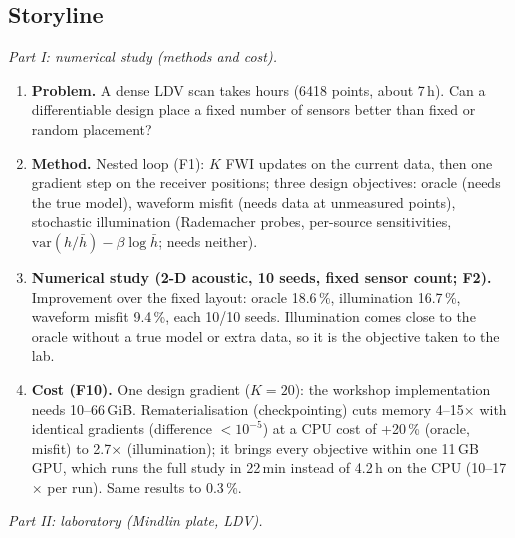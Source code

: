 \documentclass[10pt]{article}
\begin{document}
\subsection*{Storyline}
\emph{Part I: numerical study (methods and cost).}
\begin{enumerate}
\item \textbf{Problem.} A dense LDV scan takes hours (6418 points, about 7\,h). Can a differentiable design place a fixed number of sensors better than fixed or random placement?
\item \textbf{Method.} Nested loop (F1): $K$ FWI updates on the current data, then one gradient step on the receiver positions; three design objectives: oracle (needs the true model), waveform misfit (needs data at unmeasured points), stochastic illumination (Rademacher probes, per-source sensitivities, $\mathrm{var}(h/\bar h)-\beta\log\bar h$; needs neither).
\item \textbf{Numerical study (2-D acoustic, 10 seeds, fixed sensor count; F2).} Improvement over the fixed layout: oracle 18.6\,\%, illumination 16.7\,\%, waveform misfit 9.4\,\%, each 10/10 seeds. Illumination comes close to the oracle without a true model or extra data, so it is the objective taken to the lab.
\item \textbf{Cost (F10).} One design gradient ($K=20$): the workshop implementation needs 10--66\,GiB. Rematerialisation (checkpointing) cuts memory 4--15$\times$ with identical gradients (difference $<10^{-5}$) at a CPU cost of +20\,\% (oracle, misfit) to 2.7$\times$ (illumination); it brings every objective within one 11\,GB GPU, which runs the full study in 22\,min instead of 4.2\,h on the CPU (10--17$\times$ per run). Same results to 0.3\,\%.
\end{enumerate}
\emph{Part II: laboratory (Mindlin plate, LDV).}
\end{document}
